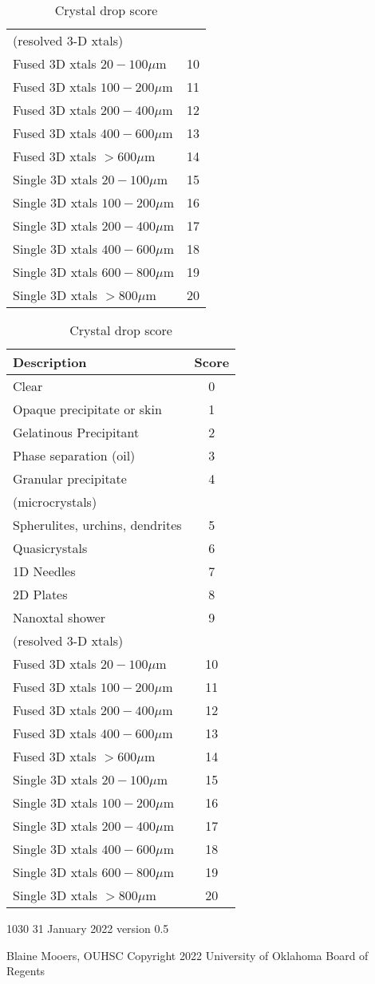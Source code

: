 \documentclass{report}
\begin{document}
\begin{table}[!htb]
\begin{minipage}{.5\linewidth}
\begin{tabular}{l c}
    (resolved 3-D xtals) &   \\ 
	Fused 3D xtals $20 - 100 \mu$m & 10  \\
	Fused 3D xtals $100 - 200 \mu$m & 11  \\ 
	Fused 3D xtals $200 - 400 \mu$m & 12  \\
	Fused 3D xtals $400 - 600 \mu$m & 13  \\
	Fused 3D xtals $> 600 \mu$m & 14  \\
    Single 3D xtals $20 - 100 \mu$m & 15  \\
	Single 3D xtals $100 - 200 \mu$m & 16  \\
	Single 3D xtals $200 - 400 \mu$m & 17 \\
	Single 3D xtals $400 - 600\mu$m & 18 \\
	Single 3D xtals $600 - 800 \mu$m & 19  \\
    Single 3D xtals $> 800 \mu$m & 20  \\
	\bottomrule
\end{tabular} 
		\caption*{Crystal drop score}
\begin{tabular}{l c}
	\toprule
	Description	& Score	 \\ 
	\midrule
	Clear & 0  \\ 
	Opaque precipitate or skin & 1  \\ 
	Gelatinous Precipitant & 2  \\ 
	Phase separation (oil) & 3  \\ 
	Granular precipitate & 4 \\
    (microcrystals) &   \\ 
	Spherulites, urchins, dendrites & 5  \\ 
    Quasicrystals & 6 \\
	1D Needles & 7  \\ 
	2D Plates & 8  \\ 
	Nanoxtal shower & 9 \\
    (resolved 3-D xtals) &   \\ 
	Fused 3D xtals $20 - 100 \mu$m & 10  \\
	Fused 3D xtals $100 - 200 \mu$m & 11  \\ 
	Fused 3D xtals $200 - 400 \mu$m & 12  \\
	Fused 3D xtals $400 - 600 \mu$m & 13  \\
	Fused 3D xtals $> 600 \mu$m & 14  \\
    Single 3D xtals $20 - 100 \mu$m & 15  \\
	Single 3D xtals $100 - 200 \mu$m & 16  \\
	Single 3D xtals $200 - 400 \mu$m & 17 \\
	Single 3D xtals $400 - 600\mu$m & 18 \\
	Single 3D xtals $600 - 800 \mu$m & 19  \\
    Single 3D xtals $> 800 \mu$m & 20  \\
	\bottomrule
\end{tabular} 
	\end{minipage}%
\end{table}
1030 31 January 2022 version 0.5

Blaine Mooers, OUHSC
Copyright 2022 University of Oklahoma Board of Regents
\end{document}
